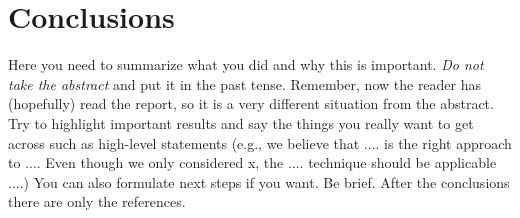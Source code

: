 \section{Conclusions}
  \label{sec:conclusions}

  Here you need to summarize what you did and why this is
  important. {\em Do not take the abstract} and put it in the past
  tense. Remember, now the reader has (hopefully) read the report, so it
  is a very different situation from the abstract. Try to highlight
  important results and say the things you really want to get across
  such as high-level statements (e.g., we believe that .... is the right
  approach to .... Even though we only considered x, the
  .... technique should be applicable ....) You can also formulate next
  steps if you want. Be brief. After the conclusions there are only the references.

